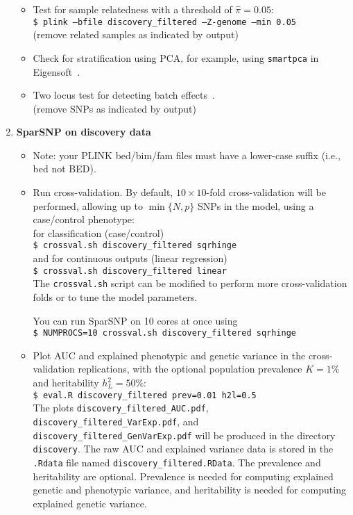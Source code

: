 \documentclass[a4paper,11pt]{article}
\begin{document}
\begin{enumerate}
\begin{itemize}
      \item Test for sample relatedness with a threshold of $\hat{\pi}=0.05$: \\
      \texttt{\$ plink --bfile discovery\_filtered --Z-genome --min 0.05} \\
      (remove related samples as indicated by output)

      \item Check for stratification using PCA, for example, using
      \texttt{smartpca} in Eigensoft~\citep{price2006}.

      \item Two locus test for detecting batch effects~\citep{lee2010b}. \\
      (remove SNPs as indicated by output)

      \end{itemize}

   \item \textbf{SparSNP on discovery data}


      \begin{itemize}

	 \item Note: your PLINK bed/bim/fam files must have a lower-case suffix
	 (i.e., bed not BED).

	 \item Run cross-validation. By default, $10\times10$-fold
	 cross-validation will be performed, allowing up to $\min \{N, p\}$ SNPs
	 in the model, using a case/control phenotype: \\ for classification
	 (case/control)\\ \texttt{\$ crossval.sh discovery\_filtered sqrhinge}\\
	 and for continuous outputs (linear regression)\\ \texttt{\$ crossval.sh
	 discovery\_filtered linear}\\ The \texttt{crossval.sh} script can be
	 modified to perform more cross-validation folds or to tune the model
	 parameters.

	 You can run SparSNP on 10 cores at once using\\
	 \texttt{\$ NUMPROCS=10 crossval.sh discovery\_filtered sqrhinge}

	 \item Plot AUC and explained phenotypic and genetic variance in the
	 cross-validation replications, with the optional
	 population prevalence $K=1\%$ and heritability $h^2_L=50\%$:\\
	 \texttt{\$ eval.R discovery\_filtered prev=0.01 h2l=0.5} \\
	 The plots \texttt{discovery\_filtered\_AUC.pdf},
	 \texttt{discovery\_filtered\_VarExp.pdf}, and
	 \texttt{discovery\_filtered\_GenVarExp.pdf}
	 will be produced in the
	 directory \texttt{discovery}.
	 The raw AUC and explained variance data is stored in the
	 \texttt{.Rdata} file named \texttt{discovery\_filtered.RData}.
	 The prevalence and heritability are optional. Prevalence is needed
	 for computing explained genetic and phenotypic variance, and heritability is
	 needed for computing explained genetic variance.


\end{itemize}
\end{enumerate}
\end{document}
